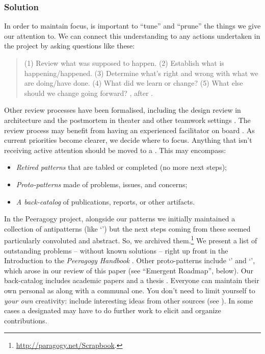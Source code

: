 \subsubsection*{Solution}
In order to maintain focus, is important to ``tune'' and ``prune'' the
things we give our attention to.  We can connect this understanding to
any actions undertaken in the project by asking questions like these:
\begin{quote}
(1) Review what was supposed to happen.
(2) Establish what is happening/happened.
(3) Determine what’s right and wrong with what we are doing/have done.
(4) What did we learn or change? 
(5) What else should we change going forward?  \cite[Chapter 28]{peeragogy-handbook}, after \cite{afteraction}.
\end{quote}
%
Other review processes have been formalised, including the design
review in architecture and the postmortem in theater and other
teamwork settings \cite{design-review,kerth2001project}.  The review
process may benefit from having an experienced facilitator on board
\cite[pp.~67, 142--143]{gabriel2002writer}.  As current priorities
become clearer, we decide where to focus.  Anything that isn't
receiving active attention should be moved to a
.  This may encompass:
\begin{itemize}
\item \emph{Retired patterns} that are tabled or completed (no more next steps);
\item \emph{Proto-patterns} made of problems, issues, and concerns;
\item \emph{A back-catalog} of publications, reports, or other
  artifacts.
\end{itemize}
In the Peeragogy project, alongside our patterns we initially
maintained a collection of antipatterns (like `') but the next steps coming from these seemed particularly
convoluted and abstract.  So, we archived
them.\footnote{\url{http://paragogy.net/Scrapbook}.}  We present a
list of outstanding problems -- without known solutions -- right up
front in the Introduction to the \emph{Peeragogy Handbook}
\cite[Chapter 1]{peeragogy-handbook}.  Other proto-patterns include
`' and `',
which arose in our review of this paper (see ``Emergent Roadmap'', below). 
Our back-catalog includes academic papers
\cite{building-peeragogy-accelerator,corneli2013inaction,corneli2012paragogical,paragogy-okcon}
and a thesis \cite{corneli-thesis}.
%
Everyone can maintain their own personal  as
along with a communal one.  You don't need to limit yourself to
\emph{your own} creativity: include interesting ideas from other
sources (see ). In some cases a
designated  may have to do further work to elicit
and organize contributions.

